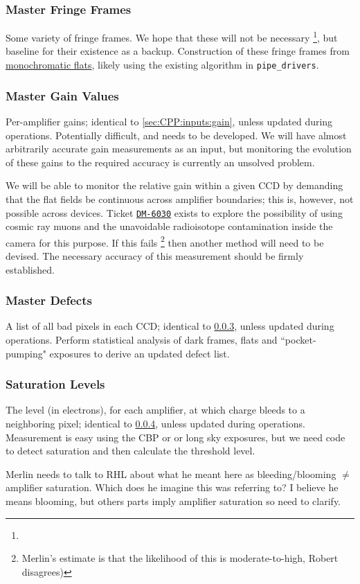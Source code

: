 \subsubsection{Master Fringe Frames}\label{sec:CPP:output:fringeFrames}
Some variety of fringe frames. We hope that these will not be necessary \footnote{}, but baseline for their existence as a backup.
\alg Construction of these fringe frames from \hyperref[sec:CPP:output:monoFlat]{monochromatic flats}, likely using the existing algorithm in \texttt{pipe\_drivers}.


\subsubsection{Master Gain Values}\label{sec:CPP:output:gains}
Per-amplifier gains; identical to \secsymbol\ref{sec:CPP:inputs:gain}, unless updated during operations.
\alg Potentially difficult, and needs to be developed. We will have almost arbitrarily accurate gain measurements as an input, but monitoring the evolution of these gains to the required accuracy is currently an unsolved problem.

We will be able to monitor the relative gain within a given CCD by demanding that the flat fields be
continuous across amplifier boundaries; this is, however, not possible across devices. Ticket \hyperref{https://jira.lsstcorp.org/browse/DM-6030}{}{}{\texttt{DM-6030}} exists to explore the possibility of using cosmic ray muons and the unavoidable radioisotope contamination inside the camera for this purpose. If this fails \footnote{Merlin's estimate is that the likelihood of this is moderate-to-high, Robert disagrees)} then another method will need to be devised. The necessary accuracy of this measurement should be firmly established.


\subsubsection{Master Defects}\label{sec:CPP:output:defectList}
A list of all bad pixels in each CCD; identical to \secsymbol\ref{sec:CPP:output:defectList}, unless updated during operations.
\alg Perform statistical analysis of dark frames, flats and ``pocket-pumping" exposures to derive an updated defect list.


\subsubsection{Saturation Levels}\label{sec:CPP:output:saturationLevel}
The level (in electrons), for each amplifier, at which charge bleeds to a neighboring pixel; identical to \secsymbol\ref{sec:CPP:output:saturationLevel}, unless updated during operations.
\alg Measurement is easy using the CBP or or long sky exposures, but we need code to detect saturation and then calculate the threshold level.
\begin{note}
	Merlin needs to talk to RHL about what he meant here as bleeding/blooming $\neq$ amplifier saturation. Which does he imagine this was referring to? I believe he means blooming, but others parts imply amplifier saturation so need to clarify.
\end{note}


